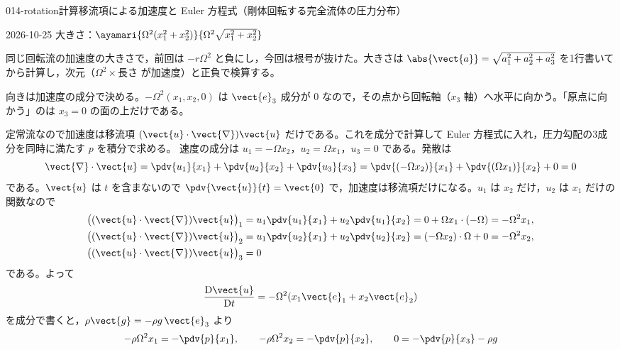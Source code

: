 \documentclass[uplatex,dvipdfmx,a4paper,11pt]{jsarticle}
\begin{document}
\begin{mondai}{014-rotation}{計算}{移流項による加速度と Euler 方程式（剛体回転する完全流体の圧力分布）}
\begin{kotaeutsushi}{2026-10-25}
大きさ：$\ayamari{\Omega^{2}(x_{1}^{2}+x_{2}^{2})}{\Omega^{2}\sqrt{x_{1}^{2}+x_{2}^{2}}}$
\end{kotaeutsushi}
\begin{kizuki}
\item {} 同じ回転流の加速度の大きさで，前回は $-r\Omega^{2}$ と負にし，今回は根号が抜けた。大きさは $\abs{\vect{a}}=\sqrt{a_{1}^{2}+a_{2}^{2}+a_{3}^{2}}$ を1行書いてから計算し，次元（$\Omega^{2}\times$長さ が加速度）と正負で検算する。
\item 向きは加速度の成分で決める。$-\Omega^{2}(x_{1},x_{2},0)$ は $\vect{e}_{3}$ 成分が $0$ なので，その点から回転軸（$x_{3}$ 軸）へ水平に向かう。「原点に向かう」のは $x_{3}=0$ の面の上だけである。
\end{kizuki}
\begin{tadashii}
\houshin 定常流なので加速度は移流項 $(\vect{u}\cdot\vect{\nabla})\vect{u}$ だけである。これを成分で計算して Euler 方程式に入れ，圧力勾配の3成分を同時に満たす $p$ を積分で求める。
\keisan {} 速度の成分は $u_1=-\Omega x_2$，$u_2=\Omega x_1$，$u_3=0$ である。発散は
\[ \vect{\nabla}\cdot\vect{u}=\pdv{u_1}{x_1}+\pdv{u_2}{x_2}+\pdv{u_3}{x_3}=\pdv{(-\Omega x_2)}{x_1}+\pdv{(\Omega x_1)}{x_2}+0=0 \]
である。$\vect{u}$ は $t$ を含まないので $\pdv{\vect{u}}{t}=\vect{0}$ で，加速度は移流項だけになる。$u_1$ は $x_2$ だけ，$u_2$ は $x_1$ だけの関数なので
\begin{align*}
\bigl((\vect{u}\cdot\vect{\nabla})\vect{u}\bigr)_1&=u_1\pdv{u_1}{x_1}+u_2\pdv{u_1}{x_2}=0+\Omega x_1\cdot(-\Omega)=-\Omega^{2}x_1,\\
\bigl((\vect{u}\cdot\vect{\nabla})\vect{u}\bigr)_2&=u_1\pdv{u_2}{x_1}+u_2\pdv{u_2}{x_2}=(-\Omega x_2)\cdot\Omega+0=-\Omega^{2}x_2,\\
\bigl((\vect{u}\cdot\vect{\nabla})\vect{u}\bigr)_3&=0
\end{align*}
である。よって
\[ \frac{\mathrm{D}\vect{u}}{\mathrm{D}t}=-\Omega^{2}(x_1\vect{e}_1+x_2\vect{e}_2) \]
  を成分で書くと，$\rho\vect{g}=-\rho g\,\vect{e}_3$ より
\[ -\rho\Omega^{2}x_1=-\pdv{p}{x_1},\qquad -\rho\Omega^{2}x_2=-\pdv{p}{x_2},\qquad 0=-\pdv{p}{x_3}-\rho g \]

\end{tadashii}
\end{mondai}
\end{document}
